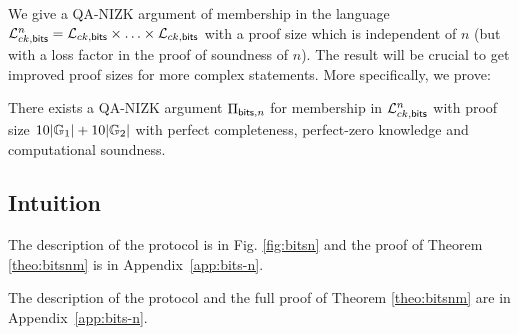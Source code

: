 We give a QA-NIZK argument of membership in the language $\mathcal{L}_{ck,\mathsf{bits}}^n  = \mathcal{L}_{ck,\mathsf{bits}} \times \ldots \times \mathcal{L}_{ck,\mathsf{bits}}$ with a proof size which is independent of $n$ (but with a loss factor in the proof of soundness of $n$). The result will be crucial to get improved proof sizes for more complex statements. More specifically, we prove: 

\begin{theorem} \label{theo:bitsnm} There exists a QA-NIZK argument $\Pi_{\mathsf{bits},n}$  for membership in $\mathcal{L}_{ck,\mathsf{bits}}^n$ with proof size  
$10|\mathbb{G}_1|+10|\mathbb{G}_2|$ with perfect completeness, perfect-zero knowledge and computational soundness. 
\end{theorem}

\iffull
\subsection{Intuition}
 
\fi

\iffull
The description of the protocol is in Fig. \ref{fig:bitsn} and the proof of Theorem \ref{theo:bitsnm} is in Appendix~\ref{app:bits-n}.

\else
The description of the protocol and the full proof of Theorem \ref{theo:bitsnm} are in Appendix~\ref{app:bits-n}.
\fi


